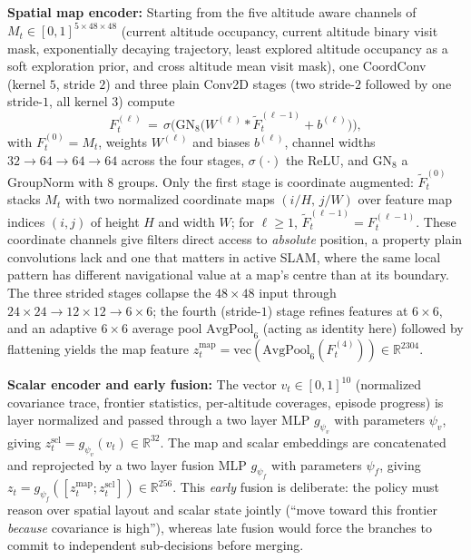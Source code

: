 \documentclass[runningheads]{llncs}
\begin{document}
\textbf{Spatial map encoder:} Starting from the five altitude aware channels of $M_t\!\in\![0,1]^{5{\times}48{\times}48}$ (current altitude occupancy, current altitude binary visit mask, exponentially decaying trajectory, least explored altitude occupancy as a soft exploration prior, and cross altitude mean visit mask), one CoordConv (kernel $5$, stride $2$) and three plain Conv2D stages (two stride-$2$ followed by one stride-$1$, all kernel $3$) compute
\begin{equation}
F^{(\ell)}_t \,=\, \sigma\big(\mathrm{GN}_8\big(W^{(\ell)}\!*\!\widetilde{F}^{(\ell-1)}_t + b^{(\ell)}\big)\big),
\label{eq:coordconv}
\end{equation}
with $F^{(0)}_t\!=\!M_t$, weights $W^{(\ell)}$ and biases $b^{(\ell)}$, channel widths $32\!\to\!64\!\to\!64\!\to\!64$ across the four stages, $\sigma(\cdot)$ the ReLU, and $\mathrm{GN}_8$ a GroupNorm with $8$ groups. Only the first stage is coordinate augmented: $\widetilde{F}^{(0)}_t$ stacks $M_t$ with two normalized coordinate maps $(i/H,\,j/W)$ over feature map indices $(i,j)$ of height $H$ and width $W$; for $\ell\!\geq\!1$, $\widetilde{F}^{(\ell-1)}_t\!=\!F^{(\ell-1)}_t$. These coordinate channels give filters direct access to \emph{absolute} position, a property plain convolutions lack and one that matters in active SLAM, where the same local pattern has different navigational value at a map's centre than at its boundary. The three strided stages collapse the $48{\times}48$ input through $24{\times}24\!\to\!12{\times}12\!\to\!6{\times}6$; the fourth (stride-$1$) stage refines features at $6{\times}6$, and an adaptive $6{\times}6$ average pool $\mathrm{AvgPool}_{6}$ (acting as identity here) followed by flattening yields the map feature $z^{\text{map}}_t = \mathrm{vec}(\mathrm{AvgPool}_{6}(F^{(4)}_t)) \in \mathbb{R}^{2304}$.

\textbf{Scalar encoder and early fusion:} The vector $v_t\!\in\![0,1]^{10}$ (normalized covariance trace, frontier statistics, per-altitude coverages, episode progress) is layer normalized and passed through a two layer MLP $g_{\psi_v}$ with parameters $\psi_v$, giving $z^{\text{scl}}_t\!=\!g_{\psi_v}(v_t)\!\in\!\mathbb{R}^{32}$. The map and scalar embeddings are concatenated and reprojected by a two layer fusion MLP $g_{\psi_f}$ with parameters $\psi_f$, giving $z_t = g_{\psi_f}([z^{\text{map}}_t; z^{\text{scl}}_t]) \in \mathbb{R}^{256}$. This \emph{early} fusion is deliberate: the policy must reason over spatial layout and scalar state jointly (``move toward this frontier \emph{because} covariance is high''), whereas late fusion would force the branches to commit to independent sub-decisions before merging.
\end{document}
